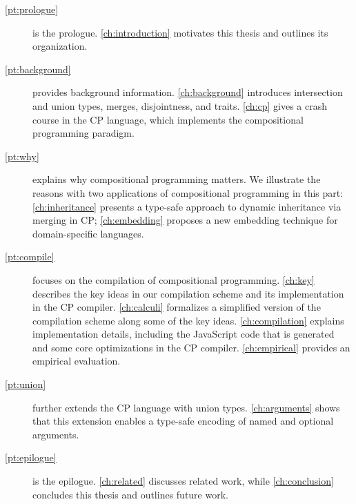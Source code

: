 \begin{description}
\item[\autoref{pt:prologue}] is the prologue. \autoref{ch:introduction}
      motivates this thesis and outlines its organization.
\item[\autoref{pt:background}] provides background information.
      \autoref{ch:background} introduces intersection and union types, merges,
      disjointness, and traits. \autoref{ch:cp} gives a crash course in the CP
      language, which implements the compositional programming paradigm.
\item[\autoref{pt:why}] explains why compositional programming matters. We
      illustrate the reasons with two applications of compositional programming
      in this part: \autoref{ch:inheritance} presents a type-safe approach to
      dynamic inheritance via merging in CP; \autoref{ch:embedding} proposes a
      new embedding technique for domain-specific languages.
\item[\autoref{pt:compile}] focuses on the compilation of compositional
      programming. \autoref{ch:key} describes the key ideas in our compilation
      scheme and its implementation in the CP compiler. \autoref{ch:calculi}
      formalizes a simplified version of the compilation scheme along some of
      the key ideas. \autoref{ch:compilation} explains implementation details,
      including the JavaScript code that is generated and some core
      optimizations in the CP compiler. \autoref{ch:empirical} provides an
      empirical evaluation.
\item[\autoref{pt:union}] further extends the CP language with union types.
      \autoref{ch:arguments} shows that this extension enables a type-safe
      encoding of named and optional arguments.
\item[\autoref{pt:epilogue}] is the epilogue. \autoref{ch:related} discusses
      related work, while \autoref{ch:conclusion} concludes this thesis and
      outlines future work.
\end{description}

\pagebreak

